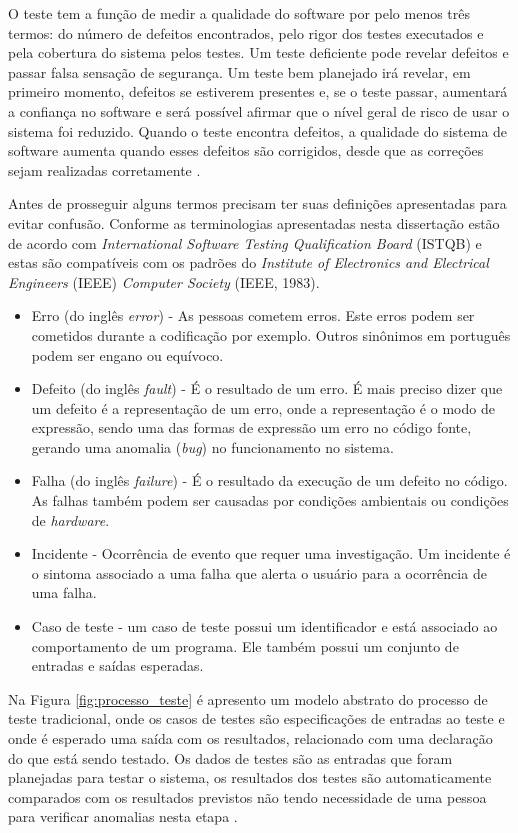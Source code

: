 O teste tem a função de medir a qualidade do software por pelo menos três termos: do número de defeitos encontrados, pelo rigor dos testes executados e pela cobertura do sistema pelos testes. Um teste deficiente pode revelar defeitos e passar falsa sensação de segurança. Um teste bem planejado irá revelar, em primeiro momento, defeitos se estiverem presentes e, se o teste passar, aumentará a confiança no software e será possível afirmar que o nível geral de risco de usar o sistema foi reduzido. Quando o teste encontra defeitos, a qualidade do sistema de software aumenta quando esses defeitos são corrigidos, desde que as correções sejam realizadas corretamente \cite{graham2008foundations}.


Antes de prosseguir alguns termos precisam ter suas definições apresentadas para evitar confusão. Conforme \cite{jorgensen2016software} as terminologias apresentadas nesta dissertação estão de acordo com \textit{International Software Testing Qualification Board} (ISTQB) e estas são compatíveis com os padrões do \textit{Institute of Electronics and Electrical Engineers} (IEEE) \textit{Computer Society} (IEEE, 1983).

\begin{itemize}
\item Erro (do inglês \textit{error}) - As pessoas cometem erros. Este erros podem ser cometidos durante a codificação por exemplo. Outros sinônimos em português podem ser engano ou equívoco.
\item Defeito (do inglês \textit{fault}) -  É o resultado de um erro. É mais preciso dizer que um defeito é a representação de um erro, onde a representação é o modo de expressão, sendo uma das formas de expressão um erro no código fonte, gerando uma anomalia (\textit{bug}) no funcionamento no sistema.
\item Falha (do inglês \textit{failure}) - É o resultado da execução de um defeito no código. As falhas também podem ser causadas por condições ambientais ou condições de \textit{hardware}.
\item Incidente - Ocorrência de evento que requer uma investigação. Um incidente é o sintoma associado a uma falha que alerta o usuário para a ocorrência de uma falha.
\item Caso de teste - um caso de teste possui um identificador e está associado ao comportamento de um programa. Ele também possui um conjunto de entradas e saídas esperadas.
\end{itemize}

Na Figura \ref{fig:processo_teste} é apresento um modelo abstrato do processo de teste tradicional, onde os casos de testes são especificações de entradas ao teste e onde é esperado uma saída com os resultados,  relacionado com uma declaração do que está sendo testado. Os dados de testes são as entradas que foram planejadas para testar o sistema, os resultados dos testes são automaticamente comparados com os resultados previstos não tendo necessidade de uma pessoa para verificar anomalias nesta etapa \cite{sommerville2010}.

